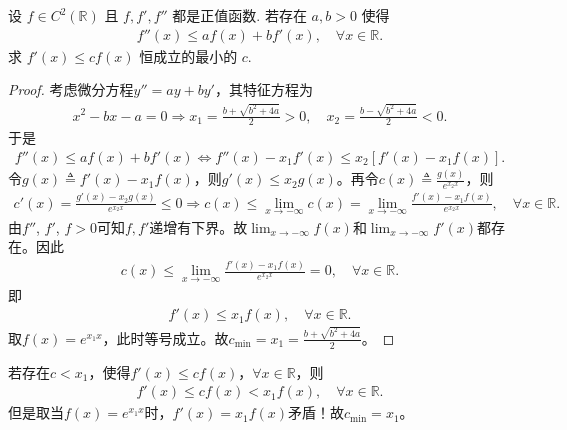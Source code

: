 \documentclass[../../main.tex]{subfiles}
\begin{document}
\begin{example}
设 $f \in C^2(\mathbb{R})$ 且 $f, f', f''$ 都是正值函数. 若存在 $a, b > 0$ 使得
\begin{align*}
f''(x) \leqslant a f(x) + b f'(x), \quad \forall x \in \mathbb{R}.
\end{align*}
求 $f'(x) \leqslant c f(x)$ 恒成立的最小的 $c$.
\end{example}
\begin{proof}
考虑微分方程$y'' = ay + by'$，其特征方程为
\begin{align*}
x^2 - bx - a = 0 \Rightarrow x_1 = \frac{b + \sqrt{b^2 + 4a}}{2} > 0, \quad x_2 = \frac{b - \sqrt{b^2 + 4a}}{2} < 0.
\end{align*}
于是
\begin{align*}
f''(x) \leqslant a f(x) + b f'(x) \Longleftrightarrow f''(x) - x_1 f'(x) \leqslant x_2 \left[ f'(x) - x_1 f(x) \right].
\end{align*}
令$g(x) \triangleq f'(x) - x_1 f(x)$，则$g'(x) \leqslant x_2 g(x)$。再令$c(x) \triangleq \frac{g(x)}{e^{x_2 x}}$，则
\begin{align*}
c'(x) = \frac{g'(x) - x_2 g(x)}{e^{x_2 x}} \leqslant 0 \Rightarrow c(x) \leqslant \lim_{x \rightarrow -\infty} c(x) = \lim_{x \rightarrow -\infty} \frac{f'(x) - x_1 f(x)}{e^{x_2 x}}, \quad \forall x \in \mathbb{R}.
\end{align*}
由$f''$, $f'$, $f > 0$可知$f, f'$递增有下界。故$\lim_{x \rightarrow -\infty} f(x)$和$\lim_{x \rightarrow -\infty} f'(x)$都存在。因此
\begin{align*}
c(x) \leqslant \lim_{x \rightarrow -\infty} \frac{f'(x) - x_1 f(x)}{e^{x_2 x}} = 0, \quad \forall x \in \mathbb{R}.
\end{align*}
即
\begin{align*}
f'(x) \leqslant x_1 f(x), \quad \forall x \in \mathbb{R}.
\end{align*}
取$f(x) = e^{x_1 x}$，此时等号成立。故$c_{\min} = x_1 = \frac{b + \sqrt{b^2 + 4a}}{2}$。
\end{proof}
\begin{remark}
若存在$c < x_1$，使得$f'(x) \leqslant c f(x)$，$\forall x \in \mathbb{R}$，则
\begin{align*}
f'(x) \leqslant c f(x) < x_1 f(x), \quad \forall x \in \mathbb{R}.
\end{align*}
但是取当$f(x) = e^{x_1 x}$时，$f'(x) = x_1 f(x)$矛盾！故$c_{\min} = x_1$。
\end{remark}
\end{document}
